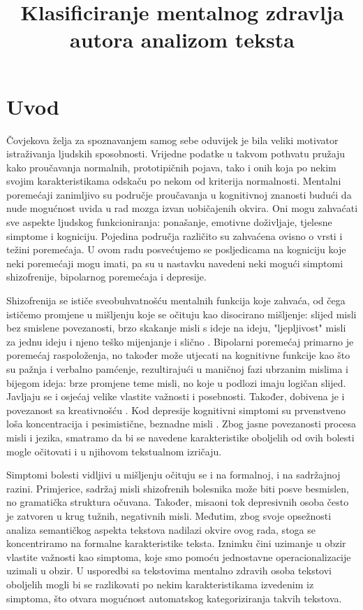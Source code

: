 \documentclass[10pt, a4paper]{article}
\title{Klasificiranje mentalnog zdravlja autora analizom teksta }
\begin{document}
\maketitleabstract

\section{Uvod}

Čovjekova želja za spoznavanjem samog sebe oduvijek je bila veliki motivator istraživanja ljudskih sposobnosti. Vrijedne podatke u takvom pothvatu pružaju kako proučavanja normalnih, prototipičnih pojava, tako i onih koja po nekim svojim karakteristikama odskaču po nekom od kriterija normalnosti. Mentalni poremećaji zanimljivo su područje proučavanja u kognitivnoj znanosti budući da nude mogućnost uvida u rad mozga izvan uobičajenih okvira. Oni mogu zahvaćati sve aspekte ljudskog funkcioniranja: ponašanje, emotivne doživljaje, tjelesne simptome i kogniciju. Pojedina područja različito su zahvaćena ovisno o vrsti i težini poremećaja. U ovom radu posvećujemo se posljedicama na kogniciju koje neki poremećaji mogu imati, pa su u nastavku navedeni neki mogući simptomi shizofrenije, bipolarnog poremećaja i depresije.

Shizofrenija se ističe sveobuhvatnošću mentalnih funkcija koje zahvaća, od čega ističemo promjene u mišljenju koje se očituju kao disocirano mišljenje: slijed misli bez smislene povezanosti, brzo skakanje misli s ideje na ideju, "ljepljivost" misli za jednu ideju i njeno teško mijenjanje i slično \citep{icd}. Bipolarni poremećaj primarno je poremećaj raspoloženja, no također može utjecati na kognitivne funkcije kao što su pažnja i verbalno pamćenje, rezultirajući u maničnoj fazi ubrzanim mislima i bijegom ideja: brze promjene teme misli, no koje u podlozi imaju logičan slijed. Javljaju se i osjećaj velike vlastite važnosti i posebnosti. Također, dobivena je i povezanost sa kreativnošću \citep{crea}. Kod depresije kognitivni simptomi su prvenstveno loša koncentracija i pesimistične, beznadne misli \citep{dsm}. Zbog jasne povezanosti procesa misli i jezika, smatramo da bi se navedene karakteristike oboljelih od ovih bolesti mogle očitovati i u njihovom tekstualnom izričaju. 

Simptomi bolesti vidljivi u mišljenju očituju se i na formalnoj, i na sadržajnoj razini. Primjerice, sadržaj misli shizofrenih bolesnika može biti posve besmislen, no gramatička struktura očuvana. Također, misaoni tok depresivnih osoba često je zatvoren u krug tužnih, negativnih misli. Međutim, zbog svoje opsežnosti analiza semantičkog aspekta tekstova nadilazi okvire ovog rada, stoga se koncentriramo na formalne karakteristike teksta. Iznimku čini uzimanje u obzir vlastite važnosti kao simptoma, koje smo pomoću jednostavne operacionalizacije uzimali u obzir. U usporedbi sa tekstovima mentalno zdravih osoba tekstovi oboljelih mogli bi se razlikovati po nekim karakteristikama izvedenim iz simptoma, što otvara mogućnost automatskog kategoriziranja takvih tekstova. 
\end{document}
